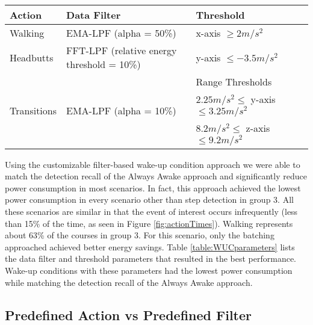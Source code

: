 
\begin{table*}[t]
    \begin{tabular}{|l|l|l|l|}
	\hline
    Action      					& Data Filter & Threshold \\ \hline
    Walking     					& EMA-LPF (alpha = 50\%) 						& x-axis $\geq 2 m/s^2$ 		\\ \hline
	Headbutts   					& FFT-LPF (relative energy threshold = 10\%) 	& y-axis $\leq -3.5 m/s^2$ 		\\ \hline
	\multirow{3}{*}{Transitions} 	& \multirow{3}{*}{EMA-LPF (alpha = 10\%)}		& Range Thresholds						\\ 
									&												& $2.25 m/s^2 \leq$ y-axis $\leq 3.25 m/s^2$ 	\\ 
									&												& $8.2 m/s^2 \leq$ z-axis $\leq 9.2 m/s^2$ 	\\ \hline
    \end{tabular}
	\caption{Filter-based Wake-up Conditions parameters that achieved the lowest power consumption while matching detection recall of the Always Awake approach}
	\label{table:WUCparameters}
\end{table*}

Using the customizable filter-based wake-up condition approach we were able to match the detection recall of the Always Awake approach and significantly reduce power consumption in most scenarios. In fact, this approach achieved the lowest power consumption in every scenario other than step detection in group 3. All these scenarios are similar in that the event of interest occurs infrequently (less than 15\% of the time, as seen in Figure \ref{fig:actionTimes}). Walking represents about 63\% of the courses in group 3. For this scenario, only the batching approached achieved better energy savings. Table \ref{table:WUCparameters} lists the data filter and threshold parameters that resulted in the best performance. Wake-up conditions with these parameters had the lowest power consumption while matching the detection recall of the Always Awake approach.

\subsection{Predefined Action vs Predefined Filter}

